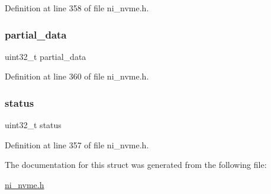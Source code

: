 Definition at line 358 of file ni\+\_\+nvme.\+h.

\mbox{\label{struct__ni__nvme__read__complete__dw0__t_adc27b66583196e08fc67292224c95865}} 
\subsubsection{\texorpdfstring{partial\_data}{partial\_data}}
{\footnotesize\ttfamily uint32\+\_\+t partial\+\_\+data}



Definition at line 360 of file ni\+\_\+nvme.\+h.

\mbox{\label{struct__ni__nvme__read__complete__dw0__t_ade20423e91627f07e610924cb0081623}} 
\subsubsection{\texorpdfstring{status}{status}}
{\footnotesize\ttfamily uint32\+\_\+t status}



Definition at line 357 of file ni\+\_\+nvme.\+h.



The documentation for this struct was generated from the following file\+:\begin{DoxyCompactItemize}
\item 
\mbox{\hyperlink{ni__nvme_8h}{ni\+\_\+nvme.\+h}}\end{DoxyCompactItemize}
